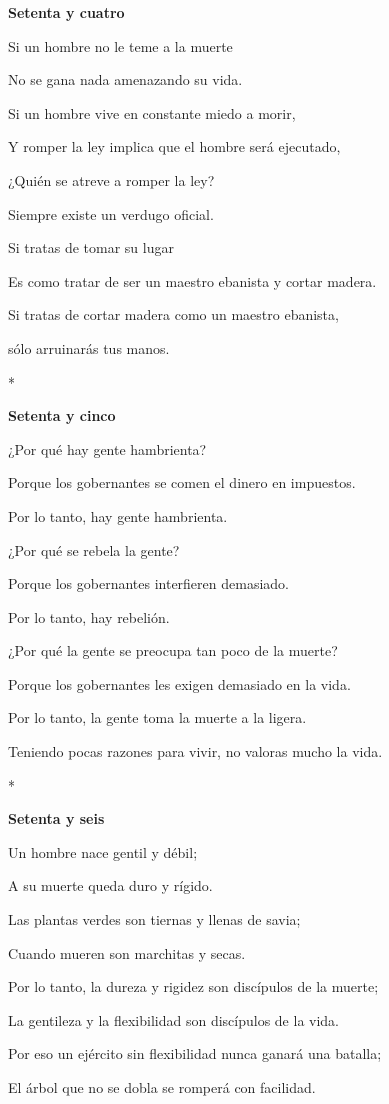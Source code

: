 \textbf{Setenta y cuatro}

Si un hombre no le teme a la muerte

No se gana nada amenazando su vida.

Si un hombre vive en constante miedo a morir,

Y romper la ley implica que el hombre será ejecutado,

¿Quién se atreve a romper la ley?

Siempre existe un verdugo oficial.

Si tratas de tomar su lugar

Es como tratar de ser un maestro ebanista y cortar madera.

Si tratas de cortar madera como un maestro ebanista,

sólo arruinarás tus manos.

*

\textbf{Setenta y cinco}

¿Por qué hay gente hambrienta?

Porque los gobernantes se comen el dinero en impuestos.

Por lo tanto, hay gente hambrienta.

¿Por qué se rebela la gente?

Porque los gobernantes interfieren demasiado.

Por lo tanto, hay rebelión.

¿Por qué la gente se preocupa tan poco de la muerte?

Porque los gobernantes les exigen demasiado en la vida.

Por lo tanto, la gente toma la muerte a la ligera.

Teniendo pocas razones para vivir, no valoras mucho la vida.

*

\textbf{Setenta y seis}

Un hombre nace gentil y débil;

A su muerte queda duro y rígido.

Las plantas verdes son tiernas y llenas de savia;

Cuando mueren son marchitas y secas.

Por lo tanto, la dureza y rigidez son discípulos de la muerte;

La gentileza y la flexibilidad son discípulos de la vida.

Por eso un ejército sin flexibilidad nunca ganará una batalla;

El árbol que no se dobla se romperá con facilidad.

